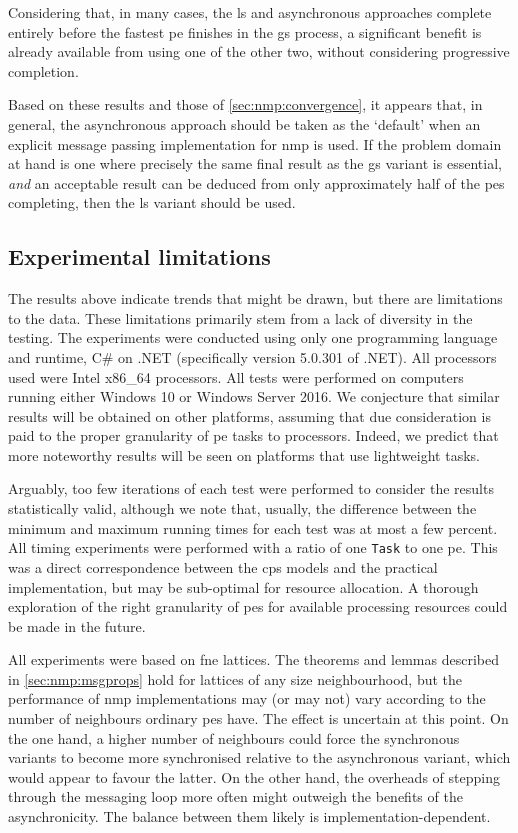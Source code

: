 Considering that, in many cases, the \gls{ls} and asynchronous approaches complete entirely before the fastest \gls{pe} finishes in the \gls{gs} process, a significant benefit is already available from using one of the other two, without considering progressive completion.

Based on these results and those of \autoref{sec:nmp:convergence}, it appears that, in general, the asynchronous approach should be taken as the `default' when an explicit message passing implementation for \gls{nmp} is used.  If the problem domain at hand is one where precisely the same final result as the \gls{gs} variant is essential, \emph{and} an acceptable result can be deduced from only approximately half of the \glspl{pe} completing, then the \gls{ls} variant should be used.

\subsection{Experimental limitations}
The results above indicate trends that might be drawn, but there are limitations to the data.  These limitations primarily stem from a lack of diversity in the testing.  The experiments were conducted using only one programming language and runtime, C\# on .NET (specifically version 5.0.301 of .NET).  All processors used were Intel x86\_64 processors.  All tests were performed on computers running either Windows 10 or Windows Server 2016.  We conjecture that similar results will be obtained on other platforms, assuming that due consideration is paid to the proper granularity of \gls{pe} tasks to processors.  Indeed, we predict that more noteworthy results will be seen on platforms that use lightweight tasks.

Arguably, too few iterations of each test were performed to consider the results statistically valid, although we note that, usually, the difference between the minimum and maximum running times for each test was at most a few percent.  All timing experiments were performed with a ratio of one \texttt{Task} to one \gls{pe}.  This was a direct correspondence between the \gls{cps} models and the practical implementation, but may be sub-optimal for resource allocation.  A thorough exploration of the right granularity of \glspl{pe} for available processing resources could be made in the future.

All experiments were based on \gls{fne} lattices.  The theorems and lemmas described in \autoref{sec:nmp:msgprops} hold for lattices of any size neighbourhood, but the performance of \gls{nmp} implementations may (or may not) vary according to the number of neighbours ordinary \glspl{pe} have.  The effect is uncertain at this point.  On the one hand, a higher number of neighbours could force the synchronous variants to become more synchronised relative to the asynchronous variant, which would appear to favour the latter.  On the other hand, the overheads of stepping through the messaging loop more often might outweigh the benefits of the asynchronicity.  The balance between them likely is implementation-dependent.